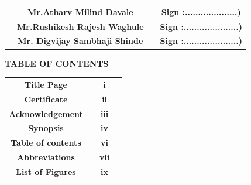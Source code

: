 \documentclass[12pt]{article}
\begin{document}
   
 \begin{tabular}{ c c c c } 
  \hspace{1.1in}&\textbf{Mr.Atharv Milind Davale} & \hspace{0.5in}  & \textbf{ Sign :....................)} \\ [1mm] 
  \hspace{1.1in} &\textbf {Mr.Rushikesh Rajesh Waghule}& \hspace{0.5in}   & \textbf{Sign :.....................) }\\[1mm]
  \hspace{1.1in}  &\textbf{ Mr. Digvijay Sambhaji Shinde } & \hspace{0.5in}  & \textbf{Sign :.....................) }\\[7mm]
 \end{tabular}   


\clearpage


\begin{center}
 \Large \textbf {TABLE OF CONTENTS }\\[15mm]
 \end{center}


\begin{tabular}{ c c c c } 
  \textbf{Title Page} & \hspace{3.5in}  & \textbf{i} \\ [5mm] 
  \textbf{Certificate} & \hspace{3.5in}  & \textbf{ii} \\ [5mm]
  \textbf{Acknowledgement} & \hspace{2.5in}  & \textbf{iii} \\ [5mm] 
  \textbf{Synopsis} & \hspace{2.5in}  & \textbf{iv} \\ [5mm] 
  \textbf{Table of contents} & \hspace{2.5in}  & \textbf{vi} \\ [5mm] 
  \textbf{Abbreviations} & \hspace{2.5in}  & \textbf{vii} \\ [5mm] 
  \textbf{List of Figures} & \hspace{2.5in}  & \textbf{ix} \\ [5mm]  
 \end{tabular}  
\end{document}
